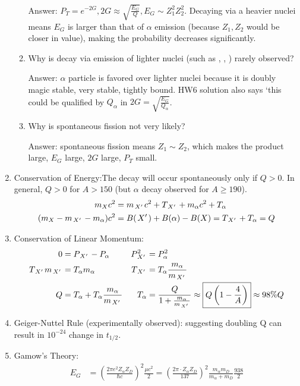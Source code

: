\documentclass{school-22.101-notes}
\begin{document}
\begin{enumerate}
\begin{enumerate}
Answer: $P_T = e^{-2G}, 2G \approx \sqrt{\frac{E_G}{Q}}, E_G \sim Z_1^2 Z_2^2$. Decaying via a heavier nuclei means $E_G$ is larger than that of $\alpha$ emission (because $Z_1, Z_2$ would be closer in value), making the probability decreases significantly. 
\item Why is decay via emission of lighter nuclei (such as , , ) rarely observed?

Answer: $\alpha$ particle is favored over lighter nuclei because it is doubly magic stable, very stable, tightly bound. HW6 solution also says `this could be qualified by $Q_{\alpha}$ in $2G = \sqrt{\frac{E_G}{Q_{\alpha}}}$. 
\item Why is spontaneous fission not very likely?

Answer: spontaneous fission means $Z_1 \sim Z_2$, which makes the product large, $E_G$ large, $2G$ large, $P_T$ small. 
\end{enumerate}
%
\item Conservation of Energy:The decay will occur spontaneously only if $Q >0$. In general, $Q>0$ for $A > 150$ (but $\alpha$ decay observed for $A \ge 190$). 
\begin{align}
m_X c^2 &= m_{\left.X^{\prime}\right.} c^2 + T_{\left.X^{\prime}\right.} + m_{\alpha} c^2 + T_{\alpha} \\
(m_X - m_{\left.X^{\prime}\right.} - m_{\alpha} ) c^2 &= B(\left.X^{\prime}\right.) + B(\alpha) - B(X) =  T_{\left.X^{\prime}\right.} + T_{\alpha} = Q \label{Q-alpha}
\end{align}
\item Conservation of Linear Momentum:
\begin{align}
0 &= P_{\left.X^{\prime}\right.} - P_{\alpha}  & P_{\left.X^{\prime}\right.}^2 &= P_{\alpha}^2 \\
T_{\left.X^{\prime}\right.} m_{\left.X^{\prime}\right.} &= T_{\alpha} m_{\alpha}  & T_{\left.X^{\prime}\right.} &= T_{\alpha} \frac{m_{\alpha}}{m_{\left.X^{\prime}\right.}} \\
Q &= T_{\alpha} + T_{\alpha} \frac{m_{\alpha}}{m_{\left.X^{\prime}\right.}}  & T_{\alpha} &= \frac{Q}{1 + \frac{m_{\alpha}}{m_{\left.X^{\prime}\right.}}}  \approx \boxed{ Q \left( 1 - \frac{4}{A} \right) } \approx 98\% Q
\end{align}
\item Geiger-Nuttel Rule (experimentally observed): suggesting doubling Q can result in $10^{-24}$ change in $t_{1/2}$.
\item Gamow's Theory:
    \begin{align}
    E_G &= \left(\frac{2 \pi e^2 Z_{\alpha} Z_D}{\hbar c}\right)^2 \frac{\mu c^2}{2} = \left( \frac{2 \pi \cdot Z_{\alpha} Z_D}{137} \right)^2 \frac{m_{\alpha} m_D}{m_{\alpha} + m_D} \frac{938}{2} \\

\end{align}
\end{enumerate}
\end{document}
